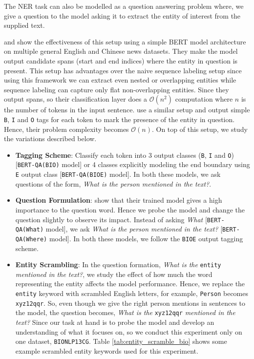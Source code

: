 The NER task can also be modelled as a question answering problem where, we give a question to the model asking it to extract the entity of interest from the supplied text. 

\cite{li2019unified} and \cite{li2019dice} show the effectiveness of this setup using a simple BERT model architecture on multiple general English and Chinese news datasets. They make the model output candidate spans (start and end indices) where the entity in question is present. This setup has advantages over the naive sequence labeling setup since using this framework we can extract even nested or overlapping entities while sequence labeling can capture only flat non-overlapping entities. Since they output spans, so their classification layer does a $\mathcal{O}(n^2)$ computation where $n$ is the number of tokens in the input sentence. \cite{banerjee2019knowledge} use a similar setup and output simple \texttt{B}, \texttt{I} and \texttt{O} tags for each token to mark the presence of the entity in question. Hence, their problem complexity becomes $\mathcal{O}(n)$. On top of this setup, we study the variations described below.

\begin{itemize}
    \item \textbf{Tagging Scheme}: Classify each token into 3 output classes (\texttt{B}, \texttt{I} and \texttt{O}) [\texttt{BERT-QA(BIO)} model] or 4 classes explicitly modeling the end boundary using \texttt{E} output class [\texttt{BERT-QA(BIOE)} model]. In both these models, we ask questions of the form, \textit{What is the person mentioned in the text?}.
    
    \item \textbf{Question Formulation}: \cite{banerjee2019knowledge} show that their trained model gives a high importance to the question word. Hence we probe the model and change the question slightly to observe its impact. Instead of asking \textit{What} [\texttt{BERT-QA(What)} model], we ask \textit{What is the person mentioned in the text?} [\texttt{BERT-QA(Where)} model]. In both these models, we follow the \texttt{BIOE} output tagging scheme.
    
    \item \textbf{Entity Scrambling}: In the question formation, \textit{What is the} \texttt{entity} \textit{mentioned in the text?}, we study the effect of how much the word representing the entity affects the model performance. Hence, we replace the \texttt{entity} keyword with scrambled English letters, for example, \texttt{Person} becomes \texttt{xyz12qqr}. So, even though we give the right person mentions in sentences to the model, the question becomes, \textit{What is the} \texttt{xyz12qqr} \textit{mentioned in the text?} Since our task at hand is to probe the model and develop an understanding of what it focuses on, so we conduct this experiment only on one dataset, \texttt{BIONLP13CG}. Table \ref{tab:entity_scramble_bio} shows some example scrambled entity keywords used for this experiment.
\end{itemize}

